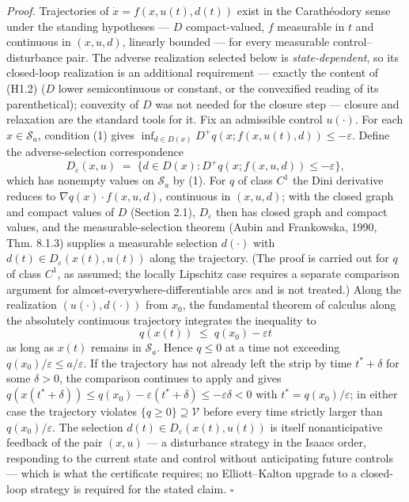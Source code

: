 \documentclass[11pt]{article}
\theoremstyle{definition}
\begin{document}
\emph{Proof.} Trajectories of \(\dot x = f(x, u(t), d(t))\) exist in the
Carath\'eodory sense under the standing hypotheses --- \(D\)
compact-valued, \(f\) measurable in \(t\) and continuous in \((x,u,d)\),
linearly bounded --- for every measurable control--disturbance pair. The
adverse realization selected below is \emph{state-dependent}, so its
closed-loop realization is an additional requirement --- exactly the content of (H1.2) (\(D\) lower semicontinuous or constant, or
the convexified reading of its parenthetical); convexity of \(D\) was
not needed for the closure step --- closure and relaxation are the
standard tools for it. Fix an admissible control \(u(\cdot)\). For each
\(x \in \mathcal{S}_a\), condition (1) gives
\(\inf_{d \in D(x)} D^+ q(x; f(x,u(t),d)) \le -\varepsilon\). Define the
adverse-selection correspondence
\[D_{\varepsilon}(x, u) \;=\; \big\{ d \in D(x) : D^+ q(x; f(x,u,d)) \le -\varepsilon \big\},\]
which has nonempty values on \(\mathcal{S}_a\) by (1). For \(q\) of
class \(C^1\) the Dini derivative reduces to
\(\nabla q(x) \cdot f(x,u,d)\), continuous in \((x,u,d)\); with the
closed graph and compact values of \(D\) (Section 2.1),
\(D_{\varepsilon}\) then has closed graph and compact values, and the
measurable-selection theorem (Aubin and Frankowska, 1990, Thm. 8.1.3)
supplies a measurable selection \(d(\cdot)\) with
\(d(t) \in D_{\varepsilon}(x(t), u(t))\) along the trajectory. (The proof is carried out for \(q\) of class \(C^1\), as assumed; the locally Lipschitz case requires a separate comparison argument for almost-everywhere-differentiable arcs and is not treated.) Along the realization
\((u(\cdot), d(\cdot))\) from \(x_0\), the fundamental theorem of
calculus along the absolutely continuous trajectory integrates the
inequality to \[q(x(t)) \;\le\; q(x_0) - \varepsilon t\] as long as
\(x(t)\) remains in \(\mathcal{S}_a\). Hence \(q \le 0\) at a time not
exceeding \(q(x_0)/\varepsilon \le a/\varepsilon\). If the trajectory
has not already left the strip by time \(t^* + \delta\) for some
\(\delta > 0\), the comparison continues to apply and gives
\(q(x(t^* + \delta)) \le q(x_0) - \varepsilon(t^* + \delta) \le -\varepsilon\delta < 0\)
with \(t^* = q(x_0)/\varepsilon\); in either case the trajectory
violates \(\{ q \ge 0 \} \supseteq \mathcal{V}\) before every time
strictly larger than \(q(x_0)/\varepsilon\). The selection
\(d(t) \in D_\varepsilon(x(t), u(t))\) is itself nonanticipative
feedback of the pair \((x, u)\) --- a disturbance strategy in the Isaacs
order, responding to the current state and control without anticipating
future controls --- which is what the certificate requires; no
Elliott--Kalton upgrade to a closed-loop strategy is required for the
stated claim. \ensuremath{\square}
\end{document}
